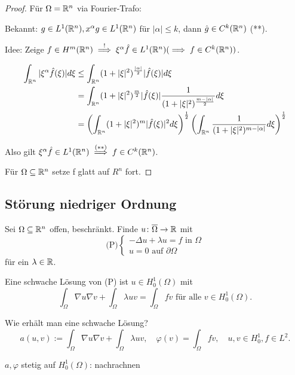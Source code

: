 \begin{proof}
  Für $\Omega = \mathbb{R}^n$ via Fourier-Trafo:

Bekannt: $g \in L^1(\mathbb{R}^n), x^\alpha g \in L^1(\mathbb{R}^n)$ für $|\alpha|\leq k$, dann $\hat g \in C^k(\mathbb{R}^n)$ (**).

Idee: Zeige $f \in H^m(\mathbb{R}^n) \overset{!}{\implies} \xi^\alpha \hat f \in L^1(\mathbb{R}^n) (\implies f \in C^k(\mathbb{R}^n))$.

\begin{align*}
  \int_{\mathbb{R}^n} |\xi^\alpha \hat f(\xi) |d\xi 
  &\leq \int_{\mathbb{R}^n} (1 + |\xi|^2)^{\frac{|\alpha|}{2}} |\hat f(\xi)| d\xi \\
  &= \int_{\mathbb{R}^n} ( 1 + |\xi|^2)^{\frac{m}{2}} |\hat f(\xi)| \frac{1}{(1 + |\xi|^2)^{\frac{m - |\alpha|}{2}}} d \xi \\
  &=\left( \int_{\mathbb{R}^n} (1 + |\xi|^2 )^m |\hat f(\xi) |^2 d\xi \right)^{\frac{1}{2}} \left( \int_{\mathbb{R}^n} \frac{1}{(1 + |\xi|^2)^{m - |\alpha|}} d\xi \right)^{\frac{1}{2}}
\end{align*}

Also gilt $\xi^\alpha \hat f \in L^1(\mathbb{R}^n) \overset{(**)}{\implies} f \in C^k(\mathbb{R}^n)$. 

Für $\Omega \subseteq \mathbb{R}^n$ setze f glatt auf $R^n$ fort.
\end{proof}

\subsection{Störung niedriger Ordnung}

Sei $\Omega \subseteq \mathbb{R}^n$ offen, beschränkt.
Finde $u \colon \overline\Omega \to \mathbb{R}$ mit
$$
\text{(P)} 
\begin{cases}
  -\Delta u + \lambda u = f \text{ in } \Omega \\
  u = 0 \text{ auf } \partial \Omega
\end{cases}
$$
für ein $\lambda \in \mathbb{R}$.

Eine schwache Lösung von (P) ist $u \in H_0^1(\Omega)$ mit
$$
\int_\Omega \nabla u \nabla v + \int_\Omega \lambda uv = \int_\Omega fv \text{ für alle } v \in H_0^1(\Omega).
$$

Wie erhält man eine schwache Lösung?
$$
a(u,v) := \int_\Omega \nabla u \nabla v + \int_\Omega \lambda u v, \quad \varphi(v) = \int_\Omega fv, \quad u,v \in H_0^1, f \in L^2.
$$

$a,\varphi$ stetig auf $H_0^1(\Omega)$: nachrachnen \checkmark

